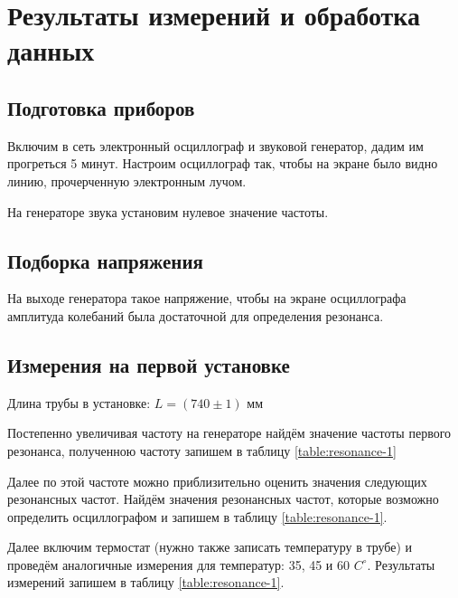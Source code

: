 \documentclass[a4paper,12pt]{article}
\begin{document}
\clearpage

\section{Результаты измерений и обработка данных}

\subsection{Подготовка приборов}

Включим в сеть электронный осциллограф и звуковой генератор, дадим им прогреться 5 минут. Настроим осциллограф так, чтобы на экране было видно линию, прочерченную электронным лучом.

На генераторе звука установим нулевое значение частоты.

\subsection{Подборка напряжения}

На выходе генератора такое напряжение, чтобы на экране осциллографа амплитуда колебаний была достаточной для определения резонанса.

\subsection{Измерения на первой установке}

Длина трубы в установке: $L = (740 \pm 1) $ мм

Постепенно увеличивая частоту на генераторе найдём значение частоты первого резонанса, полученною частоту запишем в таблицу \ref{table:resonance-1}

Далее по этой частоте можно приблизительно оценить значения следующих резонансных частот. Найдём значения резонансных частот, которые возможно определить осциллографом и запишем в таблицу \ref{table:resonance-1}.

Далее включим термостат (нужно также записать температуру в трубе) и проведём аналогичные измерения для температур: 35, 45 и 60 $C^\circ$. Результаты измерений запишем в таблицу \ref{table:resonance-1}.
\end{document}
